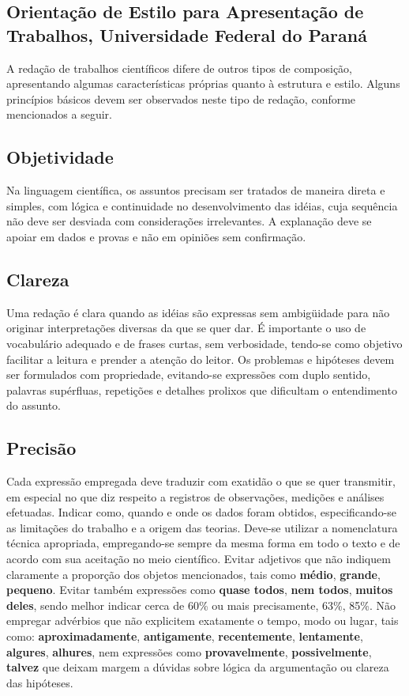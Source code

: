 \documentclass[repeatfields,xlists,xpacks,oneside]{ufrgscca}
\begin{document}
\begin{annex}


\chapter{Orientação de Estilo para Apresentação de Trabalhos, Universidade Federal do Paraná}

A redação de trabalhos científicos difere de outros tipos de composição,
apresentando algumas características próprias quanto à estrutura e estilo.
Alguns princípios básicos devem ser observados neste tipo de redação,
conforme mencionados a seguir.

\section{Objetividade}

Na linguagem científica, os assuntos precisam ser tratados de maneira direta
e simples, com lógica e continuidade no desenvolvimento das idéias, cuja
sequência não deve ser desviada com considerações irrelevantes. A explanação
deve se apoiar em dados e provas e não em opiniões sem confirmação.

\section{Clareza}

Uma redação é clara quando as idéias são expressas sem ambigüidade para não
originar interpretações diversas da que se quer dar. É importante o uso de
vocabulário adequado e de frases curtas, sem verbosidade, tendo-se como
objetivo facilitar a leitura e prender a atenção do leitor. Os problemas e
hipóteses devem ser formulados com propriedade, evitando-se expressões com
duplo sentido, palavras supérfluas, repetições e detalhes prolixos que
dificultam o entendimento do assunto.

\section{Precisão}

Cada expressão empregada deve traduzir com exatidão o que se quer
transmitir, em especial no que diz respeito a registros de observações,
medições e análises efetuadas. Indicar como, quando e onde os dados foram
obtidos, especificando-se as limitações do trabalho e a origem das teorias.
Deve-se utilizar a nomenclatura técnica apropriada, empregando-se sempre da
mesma forma em todo o texto e de acordo com sua aceitação no meio
científico. Evitar adjetivos que não indiquem claramente a proporção dos
objetos mencionados, tais como {\bf médio}, {\bf grande}, {\bf pequeno}.
Evitar também expressões como {\bf quase todos}, {\bf nem todos}, {\bf
muitos deles}, sendo melhor indicar cerca de 60\% ou mais precisamente,
63\%, 85\%. Não empregar advérbios que não explicitem exatamente o tempo,
modo ou lugar, tais como: {\bf aproximadamente}, {\bf antigamente}, {\bf
recentemente}, {\bf lentamente}, {\bf algures}, {\bf alhures}, nem
expressões como {\bf provavelmente}, {\bf possivelmente}, {\bf talvez} que
deixam margem a dúvidas sobre lógica da argumentação ou clareza das
hipóteses.


\end{annex}
\end{document}

